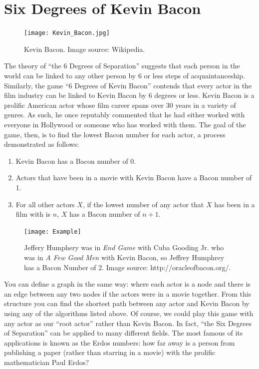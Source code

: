 \section*{Six Degrees of Kevin Bacon}
\begin{figure}[h]
\texttt{[image: Kevin\_Bacon.jpg]}
\caption{Kevin Bacon.  Image source: Wikipedia.}
\end{figure}

The theory of ``the 6 Degrees of Separation'' suggests that each person in the world can be linked to any other person by 6 or less steps of acquaintanceship.
Similarly, the game ``6 Degrees of Kevin Bacon'' contends that every actor in the film industry can be linked to Kevin Bacon by 6 degrees or less. Kevin Bacon
is a prolific American actor whose film career spans over 30 years in a variety of genres. As such, he once reputably commented that he had either worked with everyone in
Hollywood or someone who has worked with them. The goal of the game, then, is to find the lowest Bacon number for each actor, a process demonstrated as follows:
\begin{enumerate}
\item Kevin Bacon has a Bacon number of 0.
\item Actors that have been in a movie with Kevin Bacon have a Bacon number of 1.
\item For all other actors $X$, if the lowest number of any actor that $X$ has been in a film with is $n$, $X$ has a Bacon number of $n+1$.
\end{enumerate}

\begin{figure}[h]
\texttt{[image: Example]}
\caption{Jeffery Humphery was in \emph{End Game} with Cuba Gooding Jr. who was in \emph{A Few Good Men} with Kevin Bacon, so Jeffrey Humphrey has a Bacon Number of 2.  Image source: http://oracleofbacon.org/.}
\end{figure}

You can define a graph in the same way: where each actor is a node and there is an edge between any two nodes if the actors were in a movie together. From this structure you can find
the shortest path between any actor and Kevin Bacon by using any of the algorithms listed above. Of course, we could play this game with any actor as our ``root actor'' rather than Kevin Bacon. In
fact, ``the Six Degrees of Separation'' can be applied to many different fields. The most famous of its applications is known as the Erdos numbers: how far away is a person
 from publishing a paper (rather than starring in a movie) with the prolific mathematician Paul Erdos?

